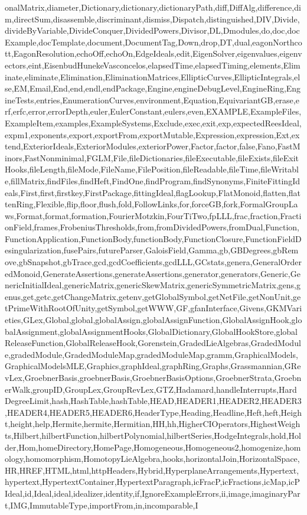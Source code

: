 {onalMatrix,diameter,Dictionary,dictionary,dictionaryPath,diff,DiffAlg,difference,dim,directSum,disassemble,discriminant,dismiss,Dispatch,distinguished,DIV,Divide,divideByVariable,DivideConquer,DividedPowers,Divisor,DL,Dmodules,do,doc,docExample,docTemplate,document,DocumentTag,Down,drop,DT,dual,eagonNorthcott,EagonResolution,echoOff,echoOn,EdgeIdeals,edit,EigenSolver,eigenvalues,eigenvectors,eint,EisenbudHunekeVasconcelos,elapsedTime,elapsedTiming,elements,Eliminate,eliminate,Elimination,EliminationMatrices,EllipticCurves,EllipticIntegrals,else,EM,Email,End,end,endl,endPackage,Engine,engineDebugLevel,EngineRing,EngineTests,entries,EnumerationCurves,environment,Equation,EquivariantGB,erase,erf,erfc,error,errorDepth,euler,EulerConstant,eulers,even,EXAMPLE,ExampleFiles,ExampleItem,examples,ExampleSystems,Exclude,exec,exit,exp,expectedReesIdeal,expm1,exponents,export,exportFrom,exportMutable,Expression,expression,Ext,extend,ExteriorIdeals,ExteriorModules,exteriorPower,Factor,factor,false,Fano,FastMinors,FastNonminimal,FGLM,File,fileDictionaries,fileExecutable,fileExists,fileExitHooks,fileLength,fileMode,FileName,FilePosition,fileReadable,fileTime,fileWritable,fillMatrix,findFiles,findHeft,FindOne,findProgram,findSynonyms,FiniteFittingIdeals,First,first,firstkey,FirstPackage,fittingIdeal,flagLookup,FlatMonoid,flatten,flattenRing,Flexible,flip,floor,flush,fold,FollowLinks,for,forceGB,fork,FormalGroupLaws,Format,format,formation,FourierMotzkin,FourTiTwo,fpLLL,frac,fraction,FractionField,frames,FrobeniusThresholds,from,fromDividedPowers,fromDual,Function,FunctionApplication,FunctionBody,functionBody,FunctionClosure,FunctionFieldDesingularization,fusePairs,futureParser,GaloisField,Gamma,gb,GBDegrees,gbRemove,gbSnapshot,gbTrace,gcd,gcdCoefficients,gcdLLL,GCstats,genera,GeneralOrderedMonoid,GenerateAssertions,generateAssertions,generator,generators,Generic,GenericInitialIdeal,genericMatrix,genericSkewMatrix,genericSymmetricMatrix,gens,genus,get,getc,getChangeMatrix,getenv,getGlobalSymbol,getNetFile,getNonUnit,getPrimeWithRootOfUnity,getSymbol,getWWW,GF,gfanInterface,Givens,GKMVarieties,GLex,Global,global,globalAssign,globalAssignFunction,GlobalAssignHook,globalAssignment,globalAssignmentHooks,GlobalDictionary,GlobalHookStore,globalReleaseFunction,GlobalReleaseHook,Gorenstein,GradedLieAlgebras,GradedModule,gradedModule,GradedModuleMap,gradedModuleMap,gramm,GraphicalModels,GraphicalModelsMLE,Graphics,graphIdeal,graphRing,Graphs,Grassmannian,GRevLex,GroebnerBasis,groebnerBasis,GroebnerBasisOptions,GroebnerStrata,GroebnerWalk,groupID,GroupLex,GroupRevLex,GTZ,Hadamard,handleInterrupts,HardDegreeLimit,hash,HashTable,hashTable,HEAD,HEADER1,HEADER2,HEADER3,HEADER4,HEADER5,HEADER6,HeaderType,Heading,Headline,Heft,heft,Height,height,help,Hermite,hermite,Hermitian,HH,hh,HigherCIOperators,HighestWeights,Hilbert,hilbertFunction,hilbertPolynomial,hilbertSeries,HodgeIntegrals,hold,Holder,Hom,homeDirectory,HomePage,Homogeneous,Homogeneous2,homogenize,homology,homomorphism,HomotopyLieAlgebra,hooks,horizontalJoin,HorizontalSpace,HR,HREF,HTML,html,httpHeaders,Hybrid,HyperplaneArrangements,Hypertext,hypertext,HypertextContainer,HypertextParagraph,icFracP,icFractions,icMap,icPIdeal,id,Ideal,ideal,idealizer,identity,if,IgnoreExampleErrors,ii,image,imaginaryPart,IMG,ImmutableType,importFrom,in,incomparable,I}
